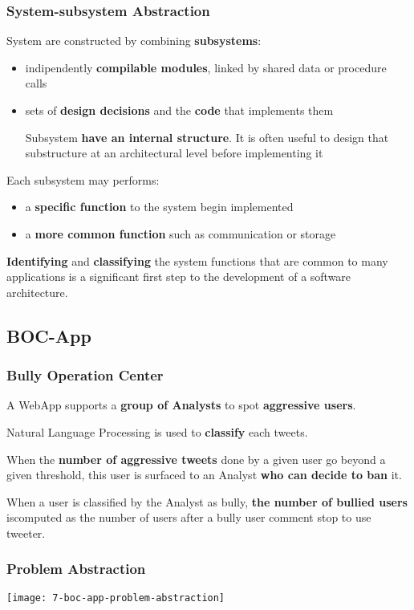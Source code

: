\subsubsection{System-subsystem Abstraction}

System are constructed by combining \textbf{subsystems}:
\begin{itemize}
	\item indipendently \textbf{compilable modules}, linked by shared data or procedure calls
	\item sets of \textbf{design decisions} and the \textbf{code} that implements them
	
Subsystem \textbf{have an internal structure}. It is often useful to design that substructure at an architectural level before implementing it
\end{itemize}

Each subsystem may performs:
\begin{itemize}
	\item a \textbf{specific function} to the system begin implemented
	\item a \textbf{more common function} such as communication or storage
\end{itemize}

\textbf{Identifying} and \textbf{classifying} the system functions that are common to many applications is a significant first step to the development of a software architecture.

\subsection{BOC-App}

\subsubsection{Bully Operation Center}
A WebApp supports a \textbf{group of Analysts} to spot \textbf{aggressive users}. 

Natural Language Processing is used to \textbf{classify} each tweets.

When the \textbf{number of aggressive tweets} done by a given user go beyond a given threshold, this user is surfaced to an Analyst \textbf{who can decide to ban} it.

When a user is classified by the Analyst as bully, \textbf{the number of bullied users} iscomputed as the number of users after a bully user comment stop to use tweeter.

\subsubsection{Problem Abstraction}
\begin{center}
\texttt{[image: 7-boc-app-problem-abstraction]}
\end{center}

